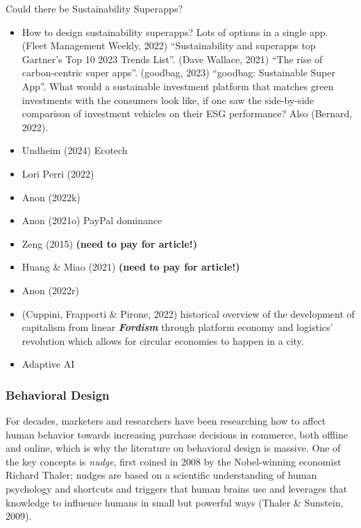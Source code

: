 \documentclass[
  letterpaper,
  DIV=11,
  numbers=noendperiod]{scrartcl}
\begin{document}
Could there be Sustainability Superapps?

\begin{itemize}
\item
  How to design sustainability superapps? Lots of options in a single
  app. (Fleet Management Weekly, 2022) ``Sustainability and superapps
  top Gartner's Top 10 2023 Trends List''. (Dave Wallace, 2021) ``The
  rise of carbon-centric super apps''. (goodbag, 2023) ``goodbag:
  Sustainable Super App''. What would a sustainable investment platform
  that matches green investments with the consumers look like, if one
  saw the side-by-side comparison of investment vehicles on their ESG
  performance? Also (Bernard, 2022).
\item
  Undheim (2024) Ecotech
\item
  Lori Perri (2022)
\item
  Anon (2022k)
\item
  Anon (2021o) PayPal dominance
\item
  Zeng (2015) \textbf{(need to pay for article!)}
\item
  Huang \& Miao (2021) \textbf{(need to pay for article!)}
\item
  Anon (2022r)
\item
  (Cuppini, Frapporti \& Pirone, 2022) historical overview of the
  development of capitalism from linear \textbf{\emph{Fordism}} through
  platform economy and logistics' revolution which allows for circular
  economies to happen in a city.
\item
  Adaptive AI
\end{itemize}

\subsubsection{Behavioral Design}\label{behavioral-design}

For decades, marketers and researchers have been researching how to
affect human behavior towards increasing purchase decisions in commerce,
both offline and online, which is why the literature on behavioral
design is massive. One of the key concepts is \emph{nudge}, first coined
in 2008 by the Nobel-winning economist Richard Thaler; nudges are based
on a scientific understanding of human psychology and shortcuts and
triggers that human brains use and leverages that knowledge to influence
humans in small but powerful ways (Thaler \& Sunstein, 2009).
\end{document}
